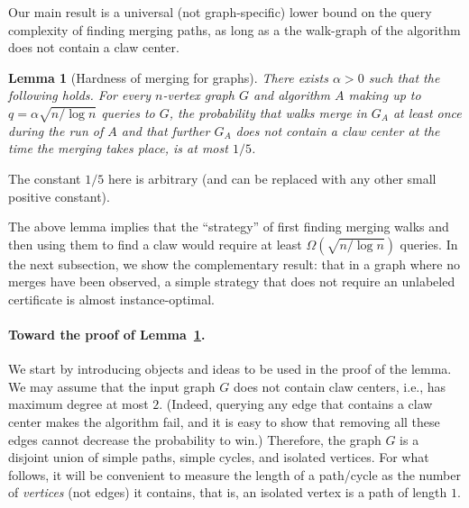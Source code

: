 \documentclass[11pt]{article}
\numberwithin{equation}{section}
\newtheorem{lemma}[lemma]{Lemma}
\newcommand{\1}{\mathbf{1}}
\begin{document}
Our main result is a universal (not graph-specific) lower bound on the query complexity of finding merging paths, as long as a the walk-graph of the algorithm does not contain a claw center.
\begin{lemma}[Hardness of merging for graphs]\label{lem:hardness_merge_graphs}
There exists $\alpha > 0$ such that the following holds. For
every $n$-vertex graph $G$ and algorithm $A$ making up to $q = \alpha \sqrt{n / \log n}$ queries to $G$, the probability that walks merge in $G_A$ at least once during the run of $A$ and that further $G_A$ does not contain a claw center at the time the merging takes place, is at most $1/5$. 
\end{lemma}
The constant $1/5$ here is arbitrary (and can be replaced with any other small positive constant). 
\iffalse
\begin{lemma}[Hardness of merging for functions]\label{lem:hardness_merge_functions}
Let $f \colon [n] \to [n]$ be a function and let $A$ be any algorithm making up to $q = o(\sqrt{n} / \log n)$ queries to $f$. The probability that the walk graph of $A$, $G_A$, contains merged walks and does not contain a collision (in $f$) is $o(1)$. 
\end{lemma}
\fi
The above lemma implies that the ``strategy'' of first finding merging walks and then using them to find a claw would require at least $\Omega(\sqrt{n /\log{n}})$ queries. In the next subsection, we show the complementary result: that in a graph where no merges have been observed, a simple strategy that does not require an unlabeled certificate is almost instance-optimal.





\paragraph{Toward the proof of Lemma~\ref{lem:hardness_merge_graphs}.} We start by introducing objects and ideas to be used in the proof of the lemma.
We may assume that the input graph $G$ does not contain claw centers, i.e., has maximum degree at most $2$. (Indeed, querying any edge that contains a claw center makes the algorithm fail, and it is easy to show that removing all these edges cannot decrease the probability to win.)
Therefore, the graph $G$ is a disjoint union of simple paths, simple cycles, and isolated vertices. For what follows, it will be convenient to measure the length of a path/cycle as the number of \emph{vertices} (not edges) it contains, that is, an isolated vertex is a path of length $1$.
\end{document}
